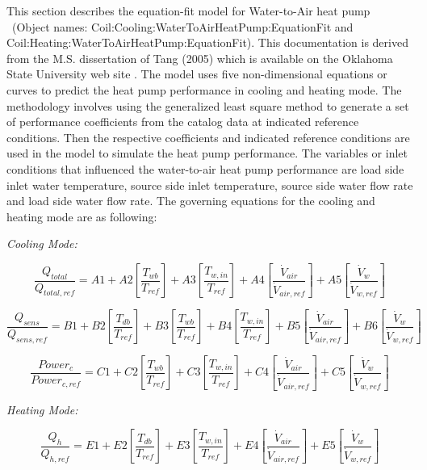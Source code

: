 This section describes the equation-fit model for Water-to-Air heat pump ~(Object names: Coil:Cooling:WaterToAirHeatPump:EquationFit and Coil:Heating:WaterToAirHeatPump:EquationFit). This documentation is derived from the M.S. dissertation of Tang (2005) which is available on the Oklahoma State University web site . The model uses five non-dimensional equations or curves to predict the heat pump performance in cooling and heating mode. The methodology involves using the generalized least square method to generate a set of performance coefficients from the catalog data at indicated reference conditions. Then the respective coefficients and indicated reference conditions are used in the model to simulate the heat pump performance. The variables or inlet conditions that influenced the water-to-air heat pump performance are load side inlet water temperature, source side inlet temperature, source side water flow rate and load side water flow rate. The governing equations for the cooling and heating mode are as following:

\emph{Cooling Mode:}

\begin{equation}
\frac{{{Q_{total}}}}{{{Q_{total,ref}}}} = A1 + A2\left[ {\frac{{{T_{wb}}}}{{{T_{ref}}}}} \right] + A3\left[ {\frac{{{T_{w,in}}}}{{{T_{ref}}}}} \right] + A4\left[ {\frac{{{{\dot V}_{air}}}}{{{{\dot V}_{air,ref}}}}} \right] + A5\left[ {\frac{{{{\dot V}_w}}}{{{{\dot V}_{w,ref}}}}} \right]
\end{equation}

\begin{equation}
\frac{{{Q_{sens}}}}{{{Q_{sens,ref}}}} = B1 + B2\left[ {\frac{{{T_{db}}}}{{{T_{ref}}}}} \right] + B3\left[ {\frac{{{T_{wb}}}}{{{T_{ref}}}}} \right] + B4\left[ {\frac{{{T_{w,in}}}}{{{T_{ref}}}}} \right] + B5\left[ {\frac{{{{\dot V}_{air}}}}{{{{\dot V}_{air,ref}}}}} \right] + B6\left[ {\frac{{{{\dot V}_w}}}{{{{\dot V}_{w,ref}}}}} \right]
\end{equation}

\begin{equation}
\frac{{Powe{r_c}}}{{Powe{r_{c,ref}}}} = C1 + C2\left[ {\frac{{{T_{wb}}}}{{{T_{ref}}}}} \right] + C3\left[ {\frac{{{T_{w,in}}}}{{{T_{ref}}}}} \right] + C4\left[ {\frac{{{{\dot V}_{air}}}}{{{{\dot V}_{air,ref}}}}} \right] + C5\left[ {\frac{{{{\dot V}_w}}}{{{{\dot V}_{w,ref}}}}} \right]
\end{equation}

\emph{Heating Mode:}

\begin{equation}
\frac{{{Q_h}}}{{{Q_{h,ref}}}} = E1 + E2\left[ {\frac{{{T_{db}}}}{{{T_{ref}}}}} \right] + E3\left[ {\frac{{{T_{w,in}}}}{{{T_{ref}}}}} \right] + E4\left[ {\frac{{{{\dot V}_{air}}}}{{{{\dot V}_{air,ref}}}}} \right] + E5\left[ {\frac{{{{\dot V}_w}}}{{{{\dot V}_{w,ref}}}}} \right]
\end{equation}

